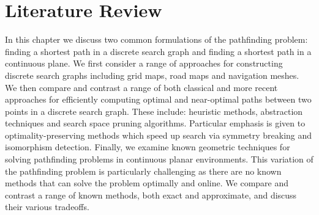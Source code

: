 \chapter{Literature Review}
\label{cha::lit::abstract}
In this chapter we discuss two common formulations of the pathfinding problem: 
finding a shortest path in a discrete search graph and finding a shortest path 
in a continuous plane.
We first consider a range of approaches for constructing discrete search graphs
including grid maps, road maps and navigation meshes.  We then compare and
contrast a range of both classical and more recent approaches for efficiently
computing optimal and near-optimal paths between two points in a discrete search
graph.  These include: heuristic methods, abstraction techniques and search
space pruning algorithms.  Particular emphasis is given to optimality-preserving
methods which speed up search via symmetry breaking and isomorphism detection.
Finally, we examine known geometric techniques for solving pathfinding problems
in continuous planar environments.  This variation of the pathfinding problem is
particularly challenging as there are no known methods that can solve the
problem optimally and online.  We compare and contrast a range of known methods,
both exact and approximate, and discuss their various tradeoffs.


